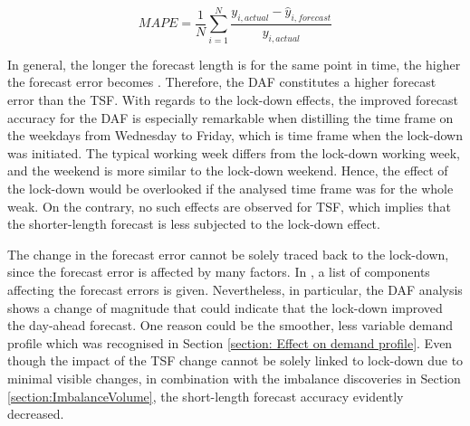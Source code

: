\documentclass[energies,article,submit,moreauthors,pdftex]{Definitions/mdpi}
\begin{document}
\begin{equation}\label{eq:MAPE}
MAPE = \frac{1}{N} \sum_{i=1}^N \frac{y_{i,actual} - \hat{y}_{i,forecast}}{y_{i,actual}}
\end{equation}


In general, the longer the forecast length is for the same point in time, the higher the forecast error becomes \cite{NationalgridESO2018QuarterlyMarch18}. 
Therefore, the DAF constitutes a higher forecast error than the TSF. With regards to the lock-down effects, the improved forecast accuracy for the DAF is especially remarkable when distilling the time frame on the weekdays from Wednesday to Friday, which is time frame when the lock-down was initiated. The typical working week differs from the lock-down working week, and the weekend is more similar to the lock-down weekend. Hence, the effect of the lock-down would be overlooked if the analysed time frame was for the whole weak. On the contrary, no such effects are observed for TSF, which implies that the shorter-length forecast is less subjected to the lock-down effect. 


The change in the forecast error cannot be solely traced back to the lock-down, since the forecast error is affected by many factors. In \cite{NationalgridESO2018QuarterlyMarch18}, a list of components affecting the forecast errors is given. 
Nevertheless, in particular, the DAF analysis shows a change of magnitude that could indicate that the lock-down improved the day-ahead forecast.
One reason could be the smoother, less variable demand profile which was recognised in Section \ref{section: Effect on demand profile}. Even though the impact of the TSF change cannot be solely linked to lock-down due to minimal visible changes, in combination with the imbalance discoveries in Section \ref{section:ImbalanceVolume}, the short-length forecast accuracy evidently decreased.
\end{document}
